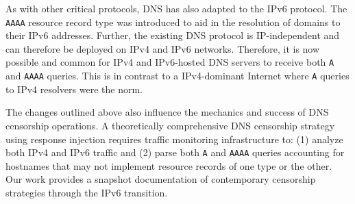 As with other critical protocols, DNS has also adapted to the IPv6 protocol.
The {\tt AAAA} resource record type was introduced to aid in the resolution of
domains to their IPv6 addresses. Further, the existing DNS protocol is
IP-independent and can therefore be deployed on IPv4 and IPv6 networks.
Therefore, it is now possible and common for IPv4 and IPv6-hosted DNS servers
to receive both {\tt A} and {\tt AAAA} queries. This is in contrast to
a IPv4-dominant Internet where {\tt A} queries to IPv4 resolvers were the norm.

The changes outlined above also influence the mechanics and success of DNS
censorship operations. A theoretically comprehensive DNS censorship strategy
using response injection requires traffic monitoring infrastructure to: (1)
analyze both IPv4 and IPv6 traffic and (2) parse both \texttt{A} and
\texttt{AAAA} queries accounting for hostnames that may not implement resource
records of one type or the other. 
%
Our work provides a snapshot documentation of contemporary
censorship strategies through the IPv6 transition.

